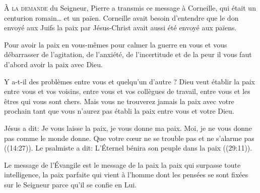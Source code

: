 



\lettrine{À}{ la demande} du Seigneur, Pierre a transmis ce message à Corneille,
 qui était un centurion romain\dots{} et un païen.
 Corneille avait besoin d'entendre que le don envoyé aux Juifs
 \ocadr la paix par Jésus-Christ \fcadr{} avait aussi été envoyé aux païens.

Pour avoir la paix en vous-mêmes \ocadr pour calmer la guerre en vous
 et vous débarrasser de l'agitation, de l'anxiété, de l'incertitude
 et de la peur \fcadr{} il vous faut d'abord avoir la paix avec Dieu.


Y a-t-il des problèmes entre vous et quelqu'un d'autre ?
 Dieu veut établir la paix entre vous et vos voisins,
 entre vous et vos collègues de travail,
 entre vous et les êtres qui vous sont chers.
 Mais vous ne trouverez jamais la paix avec votre prochain
 tant que vous n'aurez pas établi la paix entre vous et votre Dieu.

Jésus a dit: 
 \Og Je vous laisse la paix, je vous donne ma paix.
 Moi, je ne vous donne pas comme le monde donne.
 Que votre c\oe{}ur ne se trouble pas et ne s'alarme pas \Fg{}
 ((14:27)).
 Le psalmiste a dit: 
 \Og L'Éternel bénira son peuple dans la paix \Fg{}
 ((29:11)).

Le message de l'Évangile est le message de la paix
 \ocadr la paix qui surpasse toute intelligence,
 la paix parfaite qui vient à l'homme dont les pensées
 se sont fixées sur le Seigneur parce qu'il se confie en Lui.

\dvrule




